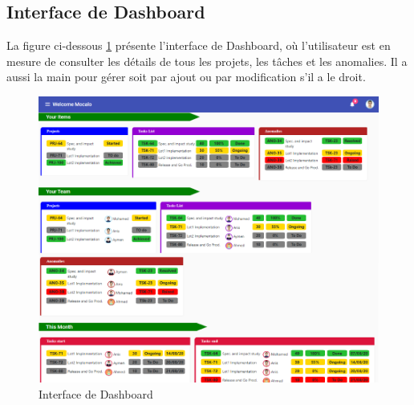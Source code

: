 \subsection{	Interface de Dashboard}
\hspace{4mm}La figure ci-dessous \ref{fig:interface_dashb} présente l’interface de Dashboard, où l’utilisateur est en mesure de consulter les détails de tous les projets, les tâches et les anomalies. Il a  aussi la main pour gérer soit par ajout ou par modification  s’il a le droit. 
\newline
\begin{figure}[h]
    \centering
    \includegraphics{figures/33anis18.png}
    \caption{Interface de Dashboard}
    \label{fig:interface_dashb}
\end{figure}\newpage
